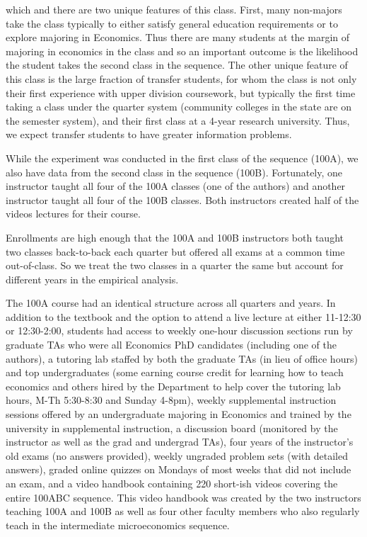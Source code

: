 \documentclass[12pt]{article}
\begin{document}
which and there are two unique features of this class. First, many non-majors take the class typically to either satisfy general education requirements or to explore majoring in Economics. Thus there are many students at the margin of majoring in economics in the class and so an important outcome is the likelihood the student takes the second class in the sequence. The other unique feature of this class is the large fraction of transfer students, for whom the class is not only their first experience with upper division coursework, but typically the first time taking a class under the quarter system (community colleges in the state are on the semester system), and their first class at a 4-year research university. Thus, we expect transfer students to have greater information problems.

While the experiment was conducted in the first class of the sequence (100A), we also have data from the second class in the sequence (100B). Fortunately, one instructor taught all four of the 100A classes (one of the authors) and another instructor taught all four of the 100B classes. Both instructors created half of the videos lectures for their course.

Enrollments are high enough that the 100A and 100B instructors both taught two classes back-to-back each quarter but offered all exams at a common time out-of-class. So we treat the two classes in a quarter the same but account for different years in the empirical analysis.

The 100A course had an identical structure across all quarters and years. In addition to the textbook and the option to attend a live lecture at either 11-12:30 or 12:30-2:00, students had access to weekly one-hour discussion sections run by graduate TAs who were all Economics PhD candidates (including one of the authors), a tutoring lab staffed by both the graduate TAs (in lieu of office hours) and top undergraduates (some earning course credit for learning how to teach economics and others hired by the Department to help cover the tutoring lab hours, M-Th 5:30-8:30 and Sunday 4-8pm), weekly supplemental instruction sessions offered by an undergraduate majoring in Economics and trained by the university in supplemental instruction, a discussion board (monitored by the instructor as well as the grad and undergrad TAs), four years of the instructor's old exams (no answers provided), weekly ungraded problem sets (with detailed answers), graded online quizzes on Mondays of most weeks that did not include an exam, and a video handbook containing 220 short-ish videos covering the entire 100ABC sequence. This video handbook was created by the two instructors teaching 100A and 100B as well as four other faculty members who also regularly teach in the intermediate microeconomics sequence.
\end{document}
